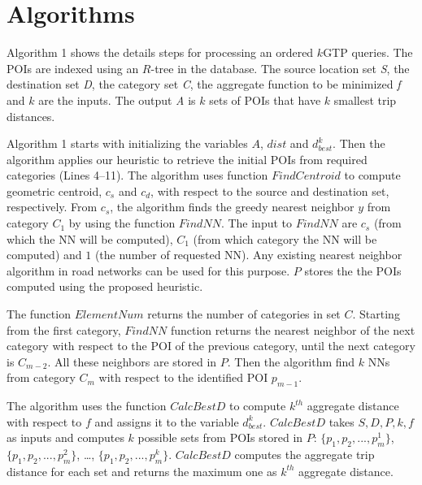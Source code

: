 \vspace*{12pt}
\section{Algorithms}
\label{alg1}

Algorithm 1 shows the details steps for processing an ordered $k$GTP queries. The POIs are indexed using an $R$-tree in the database. The source location set \textit{S}, the destination set \textit{D}, the category set \textit{C}, the aggregate function to be minimized \textit{f} and $k$ are the inputs. The output \textit{A} is $k$ sets of POIs that have $k$ smallest trip distances.

Algorithm 1 starts with initializing the variables $A$, $dist$ and $d_{best}^k$. Then the algorithm applies our heuristic to retrieve the initial POIs from required categories (Lines 4--11). The algorithm uses function $FindCentroid$ to compute geometric centroid, $c_s$ and $c_d$, with respect to the source and destination set, respectively. From $c_s$, the algorithm finds the greedy nearest neighbor $y$ from category $C_1$ by using the function $FindNN$. The input to $FindNN$ are $c_s$ (from which the NN will be computed), $C_1$ (from which category the NN will be computed) and $1$ (the number of requested NN). Any existing nearest neighbor algorithm in road networks can be used for this purpose. $P$ stores the the POIs computed using the proposed heuristic.

The function $ElementNum$ returns the number of categories in set $C$. Starting from the first category, $FindNN$ function returns the nearest neighbor of the next category with respect to the POI of the previous category, until the next category is $C_{m-2}$. All these neighbors are stored in $P$. Then the algorithm find $k$ NNs from category $C_m$ with respect to the identified POI $p_{m-1}$.

The algorithm uses the function $CalcBestD$ to compute $k^{th}$ aggregate distance with respect to $f$ and assigns it to the variable $d_{best}^k$. $CalcBestD$ takes $S, D, P, k, f$ as inputs and computes $k$ possible sets from POIs stored in $P$: $\{p_1, p_2,..., p_m^1\}$, $\{p_1, p_2,..., p_m^2\}$, \dots, $\{p_1, p_2,..., p_m^k\}$. $CalcBestD$ computes the aggregate trip distance for each set and returns the maximum one as $k^{th}$ aggregate distance.


